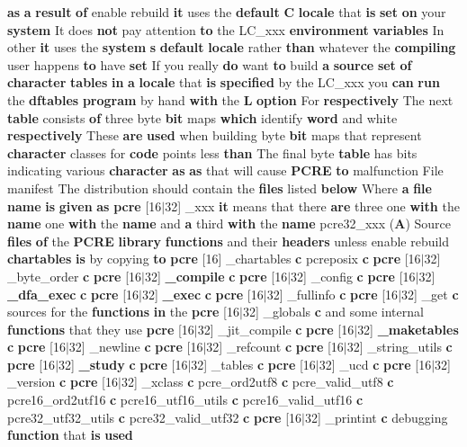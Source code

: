 {\bf as} {\bf a} {\bf result} {\bf of} enable rebuild {\bf it} uses the {\bf default} {\bf C} {\bf locale} that {\bf is} {\bf set} {\bf on} your {\bf system} It does {\bf not} pay attention {\bf to} the L\+C\+\_\+xxx {\bf environment} {\bf variables} In other {\bf it} uses the {\bf system} {\bf s} {\bf default} {\bf locale} rather {\bf than} whatever the {\bf compiling} user happens {\bf to} have {\bf set} If you really {\bf do} want {\bf to} build {\bf a} {\bf source} {\bf set} {\bf of} {\bf character} {\bf tables} {\bf in} {\bf a} {\bf locale} that {\bf is} {\bf specified} by the L\+C\+\_\+xxx you {\bf can} {\bf run} the {\bf dftables} {\bf program} by hand {\bf with} the {\bf L} {\bf option} For {\bf respectively} The next {\bf table} consists {\bf of} three byte {\bf bit} maps {\bf which} identify {\bf word} and white {\bf respectively} These {\bf are} {\bf used} when building byte {\bf bit} maps that represent {\bf character} classes for {\bf code} points less {\bf than} The final byte {\bf table} has bits indicating various {\bf character} {\bf as} {\bf as} that will cause {\bf P\+C\+RE} {\bf to} malfunction File manifest The distribution should contain the {\bf files} listed {\bf below} Where {\bf a} {\bf file} {\bf name} {\bf is} {\bf given} {\bf as} {\bf pcre} \mbox{[}16$\vert$32\mbox{]} \+\_\+xxx {\bf it} means that there {\bf are} three one {\bf with} the {\bf name} one {\bf with} the {\bf name} and {\bf a} third {\bf with} the {\bf name} pcre32\+\_\+xxx ({\bf A}) Source {\bf files} {\bf of} the {\bf P\+C\+RE} {\bf library} {\bf functions} and their {\bf headers} unless enable rebuild {\bf chartables} {\bf is} by copying {\bf to} {\bf pcre} \mbox{[}16\mbox{]} \+\_\+chartables {\bf c} pcreposix {\bf c} {\bf pcre} \mbox{[}16$\vert$32\mbox{]} \+\_\+byte\+\_\+order {\bf c} {\bf pcre} \mbox{[}16$\vert$32\mbox{]} {\bf \+\_\+compile} {\bf c} {\bf pcre} \mbox{[}16$\vert$32\mbox{]} \+\_\+config {\bf c} {\bf pcre} \mbox{[}16$\vert$32\mbox{]} {\bf \+\_\+dfa\+\_\+exec} {\bf c} {\bf pcre} \mbox{[}16$\vert$32\mbox{]} {\bf \+\_\+exec} {\bf c} {\bf pcre} \mbox{[}16$\vert$32\mbox{]} \+\_\+fullinfo {\bf c} {\bf pcre} \mbox{[}16$\vert$32\mbox{]} \+\_\+get {\bf c} sources for the {\bf functions} {\bf in} the {\bf pcre} \mbox{[}16$\vert$32\mbox{]} \+\_\+globals {\bf c} and some internal {\bf functions} that they use {\bf pcre} \mbox{[}16$\vert$32\mbox{]} \+\_\+jit\+\_\+compile {\bf c} {\bf pcre} \mbox{[}16$\vert$32\mbox{]} {\bf \+\_\+maketables} {\bf c} {\bf pcre} \mbox{[}16$\vert$32\mbox{]} \+\_\+newline {\bf c} {\bf pcre} \mbox{[}16$\vert$32\mbox{]} \+\_\+refcount {\bf c} {\bf pcre} \mbox{[}16$\vert$32\mbox{]} \+\_\+string\+\_\+utils {\bf c} {\bf pcre} \mbox{[}16$\vert$32\mbox{]} {\bf \+\_\+study} {\bf c} {\bf pcre} \mbox{[}16$\vert$32\mbox{]} \+\_\+tables {\bf c} {\bf pcre} \mbox{[}16$\vert$32\mbox{]} \+\_\+ucd {\bf c} {\bf pcre} \mbox{[}16$\vert$32\mbox{]} \+\_\+version {\bf c} {\bf pcre} \mbox{[}16$\vert$32\mbox{]} \+\_\+xclass {\bf c} pcre\+\_\+ord2utf8 {\bf c} pcre\+\_\+valid\+\_\+utf8 {\bf c} pcre16\+\_\+ord2utf16 {\bf c} pcre16\+\_\+utf16\+\_\+utils {\bf c} pcre16\+\_\+valid\+\_\+utf16 {\bf c} pcre32\+\_\+utf32\+\_\+utils {\bf c} pcre32\+\_\+valid\+\_\+utf32 {\bf c} {\bf pcre} \mbox{[}16$\vert$32\mbox{]} \+\_\+printint {\bf c} debugging {\bf function} that {\bf is} {\bf used} 